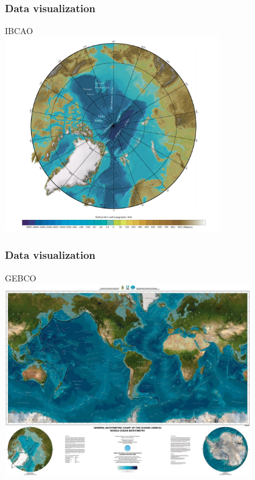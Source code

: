 \documentclass{beamer}
\begin{document}
\begin{frame}[fragile]
\frametitle{Data visualization} 

\begin{center}
IBCAO\\
\includegraphics[width=0.7\textwidth,angle=00]{IBCAO.png}\end{center}

\end{frame}

\begin{frame}[fragile]
\frametitle{Data visualization} 
\begin{center}
GEBCO\\
\includegraphics[width=0.8\textwidth,angle=00]{gda_world_map_small.jpg}\end{center}
\end{frame}
\end{document}
